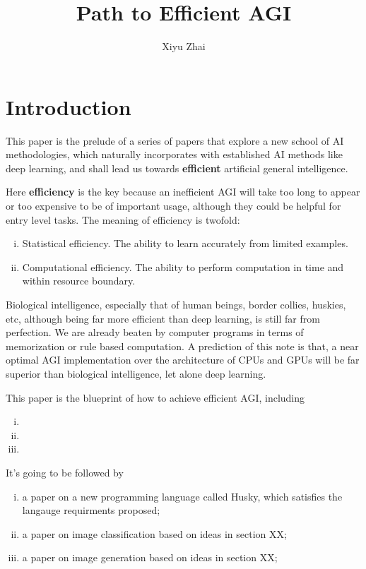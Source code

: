 \documentclass[11pt, oneside]{article}   	%
\title{Path to Efficient AGI}
\author{Xiyu Zhai}
\date{}							%
\theoremstyle{definition}
\begin{document}
\maketitle
\tableofcontents

\section{Introduction}

This paper is the prelude of a series of papers that explore a new school of AI methodologies, which naturally incorporates with established AI methods like deep learning, and shall lead us towards \textbf{efficient} artificial general intelligence.

Here \textbf{efficiency} is the key because an inefficient AGI will take too long to appear or too expensive to be of important usage, although they could be helpful for entry level tasks. The meaning of efficiency is twofold:

\begin{enumerate}[(i)]
	\item Statistical efficiency. The ability to learn accurately from limited examples.
	\item Computational efficiency. The ability to perform computation in time and within resource boundary.
\end{enumerate}

Biological intelligence, especially that of human beings, border collies, huskies, etc, although being far more efficient than deep learning, is still far from perfection. We are already beaten by computer programs in terms of memorization or rule based computation. A prediction of this note is that, a near optimal AGI implementation over the architecture of CPUs and GPUs will be far superior than biological intelligence, let alone deep learning.

This paper is the blueprint of how to achieve efficient AGI, including

\begin{enumerate}[(i)]
	\item 
	\item 
	\item 
\end{enumerate}

It's going to be followed by

\begin{enumerate}[(i)]
	\item a paper on a new programming language called Husky, which satisfies the langauge requirments proposed;
	\item a paper on image classification based on ideas in section XX;
	\item a paper on image generation based on ideas in section XX;
\end{enumerate}
\end{document}
